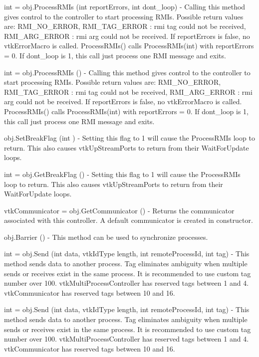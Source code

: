 \begin{DoxyItemize}
\item {\ttfamily int = obj.\-Process\-R\-M\-Is (int report\-Errors, int dont\-\_\-loop)} -\/ Calling this method gives control to the controller to start processing R\-M\-Is. Possible return values are\-: R\-M\-I\-\_\-\-N\-O\-\_\-\-E\-R\-R\-O\-R, R\-M\-I\-\_\-\-T\-A\-G\-\_\-\-E\-R\-R\-O\-R \-: rmi tag could not be received, R\-M\-I\-\_\-\-A\-R\-G\-\_\-\-E\-R\-R\-O\-R \-: rmi arg could not be received. If report\-Errors is false, no vtk\-Error\-Macro is called. Process\-R\-M\-Is() calls Process\-R\-M\-Is(int) with report\-Errors = 0. If dont\-\_\-loop is 1, this call just process one R\-M\-I message and exits.  
\item {\ttfamily int = obj.\-Process\-R\-M\-Is ()} -\/ Calling this method gives control to the controller to start processing R\-M\-Is. Possible return values are\-: R\-M\-I\-\_\-\-N\-O\-\_\-\-E\-R\-R\-O\-R, R\-M\-I\-\_\-\-T\-A\-G\-\_\-\-E\-R\-R\-O\-R \-: rmi tag could not be received, R\-M\-I\-\_\-\-A\-R\-G\-\_\-\-E\-R\-R\-O\-R \-: rmi arg could not be received. If report\-Errors is false, no vtk\-Error\-Macro is called. Process\-R\-M\-Is() calls Process\-R\-M\-Is(int) with report\-Errors = 0. If dont\-\_\-loop is 1, this call just process one R\-M\-I message and exits.  
\item {\ttfamily obj.\-Set\-Break\-Flag (int )} -\/ Setting this flag to 1 will cause the Process\-R\-M\-Is loop to return. This also causes vtk\-Up\-Stream\-Ports to return from their Wait\-For\-Update loops.  
\item {\ttfamily int = obj.\-Get\-Break\-Flag ()} -\/ Setting this flag to 1 will cause the Process\-R\-M\-Is loop to return. This also causes vtk\-Up\-Stream\-Ports to return from their Wait\-For\-Update loops.  
\item {\ttfamily vtk\-Communicator = obj.\-Get\-Communicator ()} -\/ Returns the communicator associated with this controller. A default communicator is created in constructor.  
\item {\ttfamily obj.\-Barrier ()} -\/ This method can be used to synchronize processes.  
\item {\ttfamily int = obj.\-Send (int data, vtk\-Id\-Type length, int remote\-Process\-Id, int tag)} -\/ This method sends data to another process. Tag eliminates ambiguity when multiple sends or receives exist in the same process. It is recommended to use custom tag number over 100. vtk\-Multi\-Process\-Controller has reserved tags between 1 and 4. vtk\-Communicator has reserved tags between 10 and 16.  
\item {\ttfamily int = obj.\-Send (int data, vtk\-Id\-Type length, int remote\-Process\-Id, int tag)} -\/ This method sends data to another process. Tag eliminates ambiguity when multiple sends or receives exist in the same process. It is recommended to use custom tag number over 100. vtk\-Multi\-Process\-Controller has reserved tags between 1 and 4. vtk\-Communicator has reserved tags between 10 and 16.  

\end{DoxyItemize}
